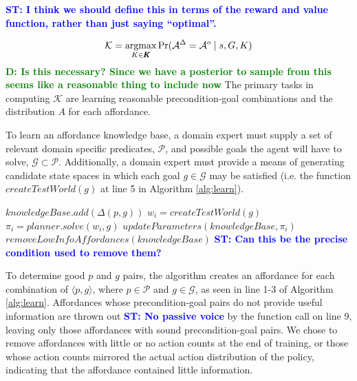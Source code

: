 \documentclass[conference]{IEEEtran}
\newcommand{\stnote}[1]{\textcolor{Blue}{\textbf{ST: #1}}}
\newcommand{\dnote}[1]{\textcolor{Green}{\textbf{D: #1}}}
\newcommand{\argmax}{\operatornamewithlimits{argmax}}
\begin{document}
\stnote{I think we should define this in terms of the reward and value
  function, rather than just saying ``optimal''.}

\begin{equation}
\mathcal{K} = \argmax_{K \in \pmb{K}} \Pr(\mathcal{A}^\Delta = \mathcal{A}^o \mid s, G, K)
\label{eq:learning_arg_max}
\end{equation}
\dnote{Is this necessary? Since we have a posterior to sample from this seems like a reasonable thing to include now}
The primary tasks in computing $\mathcal{K}$ are learning reasonable precondition-goal 
combinations and the distribution $A$ for each affordance.

To learn an affordance knowledge base, a domain 
expert must supply a set of relevant domain specific predicates,
$\mathcal{P}$, and possible goals the agent will have to solve, $\mathcal{G}
\subset \mathcal{P}$. Additionally, a domain expert must provide a means 
of generating candidate state spaces in which each goal $g \in \mathcal{G}$
may be satisfied (i.e. the function $createTestWorld(g)$ at line 5 in Algorithm \ref{alg:learn}).

\begin{algorithm}
  \caption{$learn(\mathcal{P}, \mathcal{G})$}
  \begin{algorithmic}[1]
    \State $knowledgeBase.add(\Delta(p,g))$
    \EndFor
    \State $w_i = createTestWorld(g)$
    \State $\pi_i = planner.solve(w_i, g)$
    \State $updateParameters(knowledgeBase, \pi_i)$
    \EndFor
    \State $removeLowInfoAffordances(knowledgeBase)$
    \stnote{Can this be the precise condition used to remove them?}
  \end{algorithmic}
  \label{alg:learn}
\end{algorithm}

To determine good $p$ and $g$ pairs, the algorithm creates an affordance for 
each combination of $\langle p, g \rangle$, where $p \in \mathcal{P}$ and $g
\in \mathcal{G}$, as seen in line 1-3 of Algorithm \ref{alg:learn}. Affordances
whose precondition-goal pairs do not provide useful information are thrown out 
\stnote{No passive voice}
by the function call on line 9, leaving only those affordances with sound 
precondition-goal pairs. We chose to remove affordances with little or no action
counts at the end of training, or those whose action counts mirrored the
actual action distribution of the policy, indicating that the affordance contained little 
information.
\end{document}

